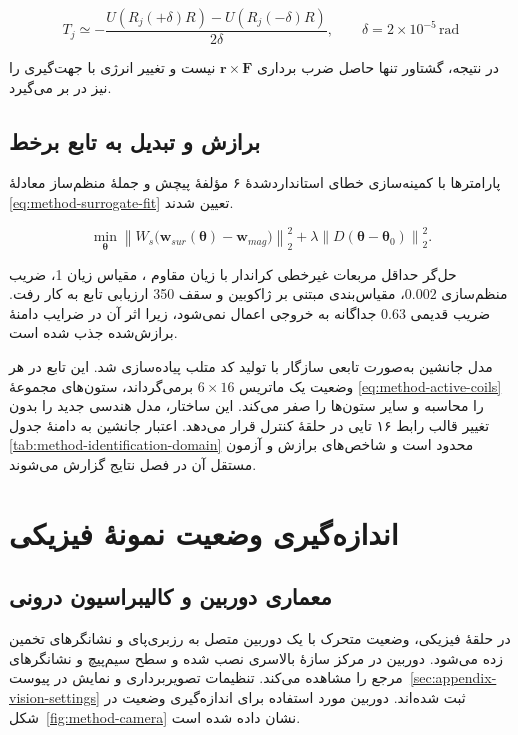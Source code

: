 \begin{equation}
	T_j\simeq-\frac{U(R_j(+\delta)R)-U(R_j(-\delta)R)}{2\delta},
	\qquad \delta=2\times10^{-5}\,\mathrm{rad}
	\label{eq:method-energy-torque}
\end{equation}

در نتیجه، گشتاور تنها حاصل ضرب برداری $\mathbf r\times\mathbf F$ نیست و تغییر انرژی با جهت‌گیری را نیز در بر می‌گیرد.

\subsection{برازش و تبدیل به تابع برخط}

پارامترها با کمینه‌سازی خطای استانداردشدهٔ ۶ مؤلفهٔ پیچش و جملهٔ منظم‌ساز معادلهٔ \ref{eq:method-surrogate-fit} تعیین شدند.

\begin{equation}
	\min_{\boldsymbol\theta}
	\left\|W_s\big(\mathbf w_{sur}(\boldsymbol\theta)-\mathbf w_{mag}\big)\right\|_2^2+
	\lambda\left\|D(\boldsymbol\theta-\boldsymbol\theta_0)\right\|_2^2.
	\label{eq:method-surrogate-fit}
\end{equation}

حل‌گر حداقل مربعات غیرخطی کراندار با زیان مقاوم ، مقیاس زیان 1، ضریب منظم‌سازی $0.002$، مقیاس‌بندی مبتنی بر ژاکوبین و سقف 350 ارزیابی تابع به کار رفت. ضریب قدیمی $0.63$ جداگانه به خروجی اعمال نمی‌شود، زیرا اثر آن در ضرایب دامنهٔ برازش‌شده جذب شده است.

مدل جانشین به‌صورت تابعی سازگار با تولید کد متلب پیاده‌سازی شد. این تابع در هر وضعیت یک ماتریس $6\times16$ برمی‌گرداند، ستون‌های مجموعهٔ \ref{eq:method-active-coils} را محاسبه و سایر ستون‌ها را صفر می‌کند. این ساختار، مدل هندسی جدید را بدون تغییر قالب رابط ۱۶ تایی در حلقهٔ کنترل قرار می‌دهد. اعتبار جانشین به دامنهٔ جدول \ref{tab:method-identification-domain} محدود است و شاخص‌های برازش و آزمون مستقل آن در فصل نتایج گزارش می‌شوند.

\section{اندازه‌گیری وضعیت نمونهٔ فیزیکی}
\label{sec:method-vision}

\subsection{معماری دوربین و کالیبراسیون درونی}

در حلقهٔ فیزیکی، وضعیت متحرک با یک دوربین متصل به رزبری‌پای و نشانگرهای  تخمین زده می‌شود. دوربین در مرکز سازهٔ بالاسری نصب شده و سطح سیم‌پیچ و نشانگرهای مرجع را مشاهده می‌کند. تنظیمات تصویربرداری و نمایش در پیوست~\ref{sec:appendix-vision-settings} ثبت شده‌اند.
دوربین مورد استفاده برای اندازه‌گیری وضعیت در شکل~\ref{fig:method-camera} نشان داده شده است.

